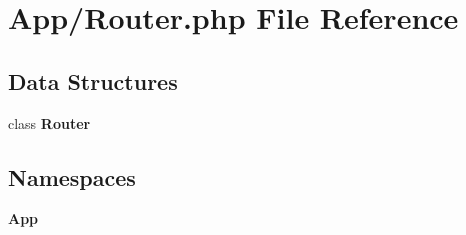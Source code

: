 \section{App/\+Router.php File Reference}
\label{_router_8php}
\subsection*{Data Structures}
\begin{DoxyCompactItemize}
\item 
class \textbf{ Router}
\end{DoxyCompactItemize}
\subsection*{Namespaces}
\begin{DoxyCompactItemize}
\item 
 \textbf{ App}
\end{DoxyCompactItemize}
